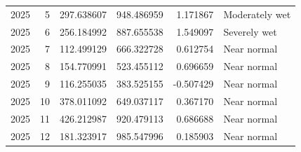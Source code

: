 \begin{tabular}{rrrrrl}
2025 & 5 & 297.638607 & 948.486959 & 1.171867 & Moderately wet \\
2025 & 6 & 256.184992 & 887.655538 & 1.549097 & Severely wet \\
2025 & 7 & 112.499129 & 666.322728 & 0.612754 & Near normal \\
2025 & 8 & 154.770991 & 523.455112 & 0.696659 & Near normal \\
2025 & 9 & 116.255035 & 383.525155 & -0.507429 & Near normal \\
2025 & 10 & 378.011092 & 649.037117 & 0.367170 & Near normal \\
2025 & 11 & 426.212987 & 920.479113 & 0.686688 & Near normal \\
2025 & 12 & 181.323917 & 985.547996 & 0.185903 & Near normal \\
\bottomrule
\end{tabular}
